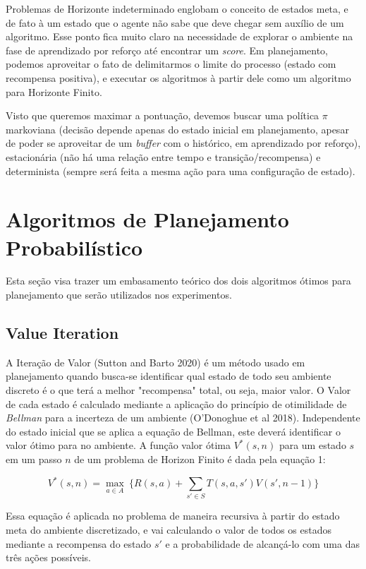 \documentclass[letterpaper]{article} %
\begin{document}
Problemas de Horizonte indeterminado englobam o conceito de estados meta, e de fato à um estado que o agente não sabe que deve chegar sem auxílio de um algoritmo. Esse ponto fica muito claro na necessidade de explorar o ambiente na fase de aprendizado por reforço até encontrar um \textit{score}. Em planejamento, podemos aproveitar o fato de delimitarmos o limite do processo (estado com recompensa positiva), e executar os algoritmos à partir dele como um algoritmo para Horizonte Finito.

Visto que queremos maximar a pontuação, devemos buscar uma política $\pi$ markoviana (decisão depende apenas do estado inicial em planejamento, apesar de poder se aproveitar de um \textit{buffer} com o histórico, em aprendizado por reforço), estacionária (não há uma relação entre tempo e transição/recompensa) e determinista (sempre será feita a mesma ação para uma configuração de estado).

\section{Algoritmos de Planejamento Probabilístico}
Esta seção visa trazer um embasamento teórico dos dois algoritmos ótimos para planejamento que serão utilizados nos experimentos.

\subsection{Value Iteration}
A Iteração de Valor (Sutton and Barto 2020) é um método usado em planejamento quando busca-se identificar qual estado de todo seu ambiente discreto é o que terá a melhor "recompensa" total, ou seja, maior valor. O Valor de cada estado é calculado mediante a aplicação do princípio de otimilidade de \textit{Bellman} para a incerteza de um ambiente (O'Donoghue et al 2018). Independente do estado inicial que se aplica a equação de Bellman, este deverá identificar o valor ótimo para no ambiente. A função valor ótima $V^{*}(s, n)$ para um estado $s$ em um passo $n$ de um problema de Horizon Finito é dada pela equação 1:

\begin{equation}
V^{*}(s, n) = \max_{a \in A} \ \{ R(s,a) + \sum_{s' \in S} T(s,a,s')  V(s', n-1)\}
\end{equation}

Essa equação é aplicada no problema de maneira recursiva à partir do estado meta do ambiente discretizado, e vai calculando o valor de todos os estados mediante a recompensa do estado $s'$ e a probabilidade de alcançá-lo com uma das três ações possíveis.
\end{document}
